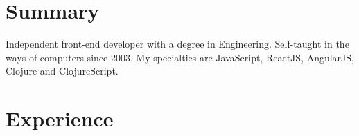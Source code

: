 \documentclass[letterpaper]{deedy-resume} %
\begin{document}
%
%
%
%
%
%
%
%
%
%


\section{Summary}
\flushleft\location{} %

Independent front-end developer with a degree in Engineering. Self-taught
in the ways of computers since 2003. My specialties are JavaScript,
ReactJS, AngularJS, Clojure and ClojureScript.

\sectionspace %

\section{Experience}
\end{document}
